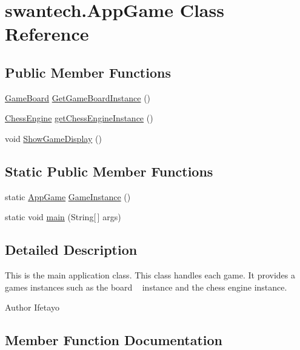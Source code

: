 \hypertarget{classswantech_1_1_app_game}{}\section{swantech.\+App\+Game Class Reference}
\label{classswantech_1_1_app_game}
\subsection*{Public Member Functions}
\begin{DoxyCompactItemize}
\item 
\hyperlink{classswantech_1_1_game_board}{Game\+Board} \hyperlink{classswantech_1_1_app_game_a9751af8444b8e7701201545bb84737ba}{Get\+Game\+Board\+Instance} ()
\item 
\hyperlink{classswantech_1_1_chess_engine}{Chess\+Engine} \hyperlink{classswantech_1_1_app_game_ab4cc6220fbfbc5497b292035e0d95436}{get\+Chess\+Engine\+Instance} ()
\item 
void \hyperlink{classswantech_1_1_app_game_ab01ef73e8ce1e2b21a58daad0ad535a1}{Show\+Game\+Display} ()
\end{DoxyCompactItemize}
\subsection*{Static Public Member Functions}
\begin{DoxyCompactItemize}
\item 
static \hyperlink{classswantech_1_1_app_game}{App\+Game} \hyperlink{classswantech_1_1_app_game_a787d970e7a546bb0aabd34b7d7d43358}{Game\+Instance} ()
\item 
static void \hyperlink{classswantech_1_1_app_game_ae4539dec0adb6828afdbdbb8662e4d1d}{main} (String\mbox{[}$\,$\mbox{]} args)
\end{DoxyCompactItemize}


\subsection{Detailed Description}
This is the main application class. This class handles each game. It provides a game\textquotesingle{}s instances such as the board ~\newline
 instance and the chess engine instance. \begin{DoxyAuthor}{Author}
Ifetayo 
\end{DoxyAuthor}


\subsection{Member Function Documentation}
\hypertarget{classswantech_1_1_app_game_a787d970e7a546bb0aabd34b7d7d43358}{}
